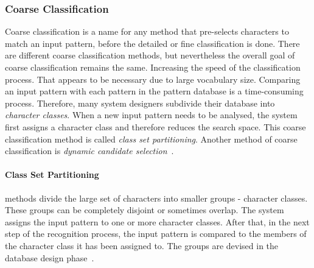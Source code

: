 \subsubsection{Coarse Classification}
\label{sec:olccr:coarseclassification}

Coarse classification is a name for any method that pre-selects characters
to match an input pattern, before the detailed or fine classification is done.
There are different coarse classification methods, but nevertheless the overall
goal of coarse classification remains the same. Increasing the speed of the
classification process.
That appears to be necessary due to large vocabulary size. Comparing an input
pattern with each pattern in the pattern database is a time-consuming process.
Therefore, many system designers subdivide their database into \emph{character
classes}. When a new input pattern needs to be analysed, the system first assigns
a character class and therefore reduces the search space. This coarse 
classification method is called \emph{class set partitioning}. Another method of 
coarse classification is \emph{dynamic candidate 
selection}~.

\paragraph{Class Set Partitioning} methods divide the large set of characters  
into smaller groups - character classes. These groups can be completely disjoint 
or sometimes overlap. The system assigns the input pattern to one or more 
character classes. After that, in the next step of the recognition process, 
the input pattern is compared to the members of the character class it has been 
assigned to. The groups are devised in the database design 
phase~.

